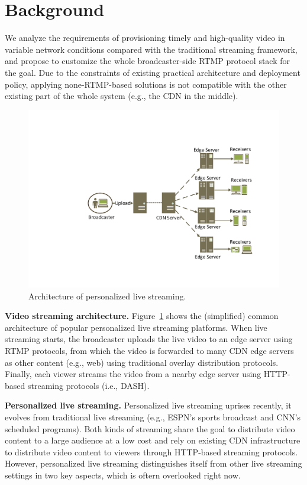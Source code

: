 \section{Background}
We analyze the requirements of provisioning timely and high-quality video in variable network conditions compared with the traditional streaming framework, and propose to customize the whole broadcaster-side RTMP protocol stack for the goal. Due to the constraints of existing practical architecture and deployment policy, applying none-RTMP-based solutions is not compatible with the other existing part of the whole system (e.g., the CDN in the middle).

\begin{figure}[t]
\centerline{\includegraphics[width=0.9\columnwidth]{fig/architecture.pdf}}
\vspace{-0.08in}
\caption{Architecture of personalized live streaming.}
\vspace{-0.1in}
\label{fig:architecture}
\end{figure}
\textbf{Video streaming architecture.}
Figure~\ref{fig:architecture} shows the (simplified) common architecture 
of popular personalized live streaming platforms. When live streaming 
starts, the broadcaster uploads the live video to an edge server using 
RTMP protocols, from which the video is forwarded to many CDN edge servers 
as other content (e.g., web) using traditional overlay distribution 
protocols. Finally, each viewer streams the video from a nearby edge
server using HTTP-based streaming protocols (i.e., DASH).

\textbf{Personalized live streaming.}
Personalized live streaming uprises recently, it evolves from traditional live streaming (e.g., ESPN's sports broadcast
and CNN's scheduled programs). Both kinds of streaming share the goal to distribute video content to a large audience at a low cost and  rely on existing CDN infrastructure to distribute video content to viewers through HTTP-based streaming protocols. However, personalized live streaming distinguishes itself from 
other live streaming settings in two key aspects, which is oftern overlooked right now.

